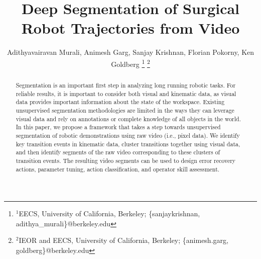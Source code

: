 \documentclass[letterpaper, 10 pt, conference]{ieeeconf}
\title{\LARGE \bf
Deep Segmentation of Surgical Robot Trajectories from Video 
}
\author{%
Adithyavairavan Murali, Animesh Garg, Sanjay Krishnan, Florian Pokorny, Ken Goldberg
\thanks{$^{1}$EECS, University of California, Berkeley; {\{sanjaykrishnan, adithya\_murali\}@berkeley.edu}}%
\thanks{$^{2}$IEOR and EECS, University of California, Berkeley; {\{animesh.garg, goldberg\}@berkeley.edu}}%
}
\begin{document}
\maketitle

\begin{abstract}
Segmentation is an important first step in analyzing long running robotic tasks. For reliable results, it is important to consider both visual and kinematic data, as visual data provides important information about the state of the workspace. 
Existing unsupervised segmentation methodologies are limited in the ways they can leverage visual data and rely on annotations or complete knowledge of all objects in the world. In this paper, we propose a framework that takes a step towards unsupervised segmentation of robotic demonstrations using raw video (i.e., pixel data). 
We identify key transition events in kinematic data, cluster transitions together using visual data, and then identify segments of the raw video corresponding to these clusters of transition events. 
The resulting video segments can be used to design error recovery actions, parameter tuning, action classification, 
and operator skill assessment. 
\end{abstract} 












\end{document}
